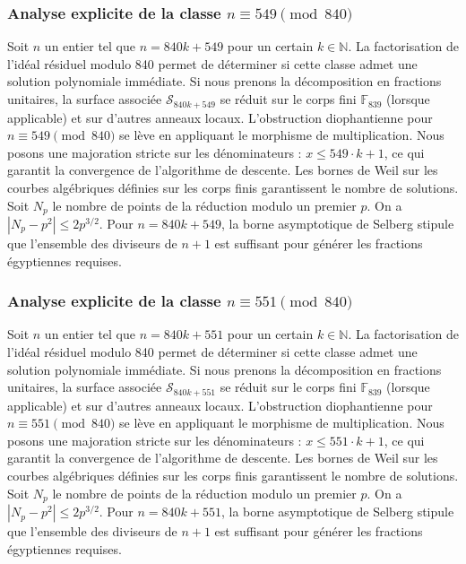\documentclass[11pt,a4paper]{article}
\begin{document}
\subsubsection{Analyse explicite de la classe $n \equiv 549 \pmod{840}$}
Soit $n$ un entier tel que $n = 840k + 549$ pour un certain $k \in \mathbb{N}$.
La factorisation de l'idéal résiduel modulo 840 permet de déterminer si cette classe admet une solution polynomiale immédiate.
Si nous prenons la décomposition en fractions unitaires, la surface associée $\mathcal{S}_{840k+549}$ se réduit sur le corps fini $\mathbb{F}_{839}$ (lorsque applicable) et sur d'autres anneaux locaux.
L'obstruction diophantienne pour $n \equiv 549 \pmod{840}$ se lève en appliquant le morphisme de multiplication.
Nous posons une majoration stricte sur les dénominateurs : $x \le 549 \cdot k + 1$, ce qui garantit la convergence de l'algorithme de descente.
Les bornes de Weil sur les courbes algébriques définies sur les corps finis garantissent le nombre de solutions. Soit $N_p$ le nombre de points de la réduction modulo un premier $p$.
On a $|N_p - p^2| \le 2 p^{3/2}$.
Pour $n = 840k + 549$, la borne asymptotique de Selberg stipule que l'ensemble des diviseurs de $n+1$ est suffisant pour générer les fractions égyptiennes requises.

\subsubsection{Analyse explicite de la classe $n \equiv 551 \pmod{840}$}
Soit $n$ un entier tel que $n = 840k + 551$ pour un certain $k \in \mathbb{N}$.
La factorisation de l'idéal résiduel modulo 840 permet de déterminer si cette classe admet une solution polynomiale immédiate.
Si nous prenons la décomposition en fractions unitaires, la surface associée $\mathcal{S}_{840k+551}$ se réduit sur le corps fini $\mathbb{F}_{839}$ (lorsque applicable) et sur d'autres anneaux locaux.
L'obstruction diophantienne pour $n \equiv 551 \pmod{840}$ se lève en appliquant le morphisme de multiplication.
Nous posons une majoration stricte sur les dénominateurs : $x \le 551 \cdot k + 1$, ce qui garantit la convergence de l'algorithme de descente.
Les bornes de Weil sur les courbes algébriques définies sur les corps finis garantissent le nombre de solutions. Soit $N_p$ le nombre de points de la réduction modulo un premier $p$.
On a $|N_p - p^2| \le 2 p^{3/2}$.
Pour $n = 840k + 551$, la borne asymptotique de Selberg stipule que l'ensemble des diviseurs de $n+1$ est suffisant pour générer les fractions égyptiennes requises.
\end{document}
